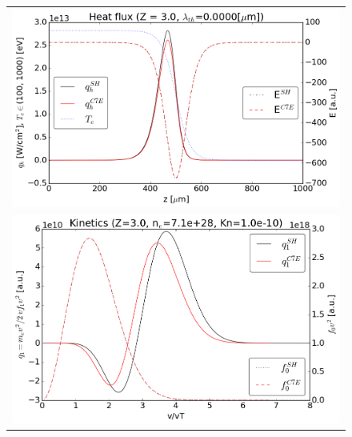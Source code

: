 \documentclass[preprint,12pt]{elsarticle}
\begin{document}
\begin{figure}[tbh]
  \begin{center}
    \begin{tabular}{c}
      \includegraphics[width=1.0\textwidth]{../results/fe_analysis/C7E/P5_heatflux_Z3_Kn1e-10.png} \\ 
      \includegraphics[width=1.0\textwidth]{../results/fe_analysis/C7E/P5_kinetics_Z3_Kn1e-10.png}
    \end{tabular}
  \caption{
  }
  \end{center}
  \label{fig:AWBScorrection_f1}
\end{figure}
\end{document}
